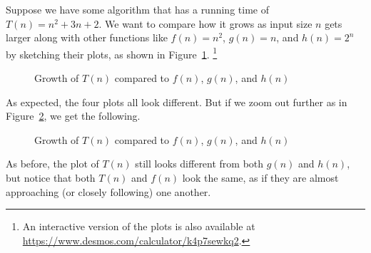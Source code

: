 \begin{example}

Suppose we have some algorithm that has a running time of $T\left(n\right) = n^2 + 3n + 2$. We want to compare how it grows as input size $n$ gets larger along with other functions like $f\left(n\right) = n^2$, $g\left(n\right) = n$, and $h\left(n\right) = 2^n$ by sketching their plots, as shown in Figure~\ref{fig:growth_comp}. \footnote{An interactive version of the plots is also available at \url{https://www.desmos.com/calculator/k4p7sewkq2}.}

\begin{figure}[H]
	\centering
	\caption{Growth of $T\left(n\right)$ compared to $f\left(n\right)$, $g\left(n\right)$, and $h\left(n\right)$}
	\label{fig:growth_comp}
\end{figure}

As expected, the four plots all look different. But if we zoom out further as in Figure~\ref{fig:growth_comp_zoomout}, we get the following.

\begin{figure}[H]
	\centering
	\caption{Growth of $T\left(n\right)$ compared to $f\left(n\right)$, $g\left(n\right)$, and $h\left(n\right)$}
	\label{fig:growth_comp_zoomout}
\end{figure}

As before, the plot of $T\left(n\right)$ still looks different from both $g\left(n\right)$ and $h\left(n\right)$, but notice that both $T\left(n\right)$ and $f\left(n\right)$ look the same, as if they are almost approaching (or closely following) one another.

\end{example}



